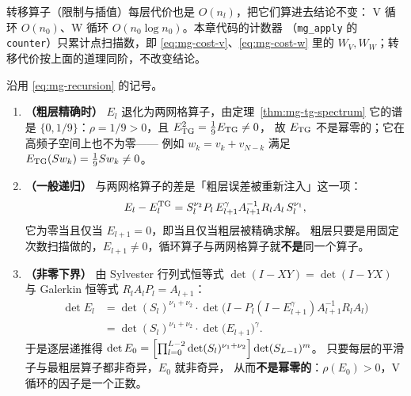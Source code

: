 \begin{remark}
转移算子（限制与插值）每层代价也是 $O(n_l)$，把它们算进去结论不变：
V 循环 $O(n_0)$、W 循环 $O(n_0\log n_0)$。本章代码的计数器
（\texttt{mg\_apply} 的 \texttt{counter}）只累计点扫描数，即 \eqref{eq:mg-cost-v}、\eqref{eq:mg-cost-w}
里的 $W_V,W_W$；转移代价按上面的道理同阶，不改变结论。
\end{remark}

\begin{theorem}[V 循环的因子不是零]
\label{thm:mg-nonzero}
沿用 \eqref{eq:mg-recursion} 的记号。
\begin{enumerate}
  \item \textbf{（粗层精确时）} $E_l$ 退化为两网格算子，由定理~\ref{thm:mg-tg-spectrum}
        它的谱是 $\{0,1/9\}$：$\rho=1/9>0$，且 $E_{\rm TG}^2=\frac19E_{\rm TG}\ne0$，
        故 $E_{\rm TG}$ 不是幂零的；它在高频子空间上也不为零——
        例如 $w_k=v_k+v_{N-k}$ 满足 $E_{\rm TG}(Sw_k)=\frac19Sw_k\ne0$。
  \item \textbf{（一般递归）} 与两网格算子的差是「粗层误差被重新注入」这一项：
        \begin{equation}
          E_l-E_l^{\rm TG}=S_l^{\nu_2}P_l\,E_{l+1}^{\gamma}A_{l+1}^{-1}R_lA_l\,S_l^{\nu_1},
          \label{eq:mg-cycle-diff}
        \end{equation}
        它为零当且仅当 $E_{l+1}=0$，即当且仅当粗层被精确求解。
        粗层只要是用固定次数扫描做的，$E_{l+1}\ne0$，循环算子与两网格算子就\textbf{不是}同一个算子。
  \item \textbf{（非零下界）} 由 Sylvester 行列式恒等式
        $\det(I-XY)=\det(I-YX)$ 与 Galerkin 恒等式 $R_lA_lP_l=A_{l+1}$：
        \begin{equation}
          \begin{aligned}
            \det E_l&=\det(S_l)^{\nu_1+\nu_2}\cdot
            \det\bigl(I-P_l(I-E_{l+1}^{\gamma})A_{l+1}^{-1}R_lA_l\bigr)\\
            &=\det(S_l)^{\nu_1+\nu_2}\cdot\det\bigl(E_{l+1}\bigr)^{\gamma}.
          \end{aligned}
          \label{eq:mg-det}
        \end{equation}
        于是逐层递推得
        $\det E_0=\Bigl[\prod_{l=0}^{L-2}\det(S_l)^{\nu_1+\nu_2}\Bigr]\det(S_{L-1})^{m}$。
        只要每层的平滑子与最粗层算子都非奇异，$E_0$ 就非奇异，
        从而\textbf{不是幂零的}：$\rho(E_0)>0$，V 循环的因子是一个正数。
\end{enumerate}
\end{theorem}

